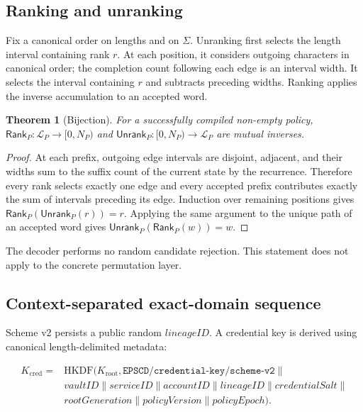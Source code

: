 \documentclass[preprint,12pt]{elsarticle}
\newcommand{\Lang}{\mathcal{L}}
\newcommand{\Rank}{\mathsf{Rank}}
\newcommand{\Unrank}{\mathsf{Unrank}}
\newtheorem{theorem}{Theorem}
\begin{document}
\subsection{Ranking and unranking}

Fix a canonical order on lengths and on $\Sigma$. Unranking first selects the
length interval containing rank $r$. At each position, it considers outgoing
characters in canonical order; the completion count following each edge is an
interval width. It selects the interval containing $r$ and subtracts preceding
widths. Ranking applies the inverse accumulation to an accepted word.

\begin{theorem}[Bijection]
For a successfully compiled non-empty policy, $\Rank_P:\Lang_P\rightarrow
[0,N_P)$ and $\Unrank_P:[0,N_P)\rightarrow\Lang_P$ are mutual inverses.
\end{theorem}

\begin{proof}
At each prefix, outgoing edge intervals are disjoint, adjacent, and their widths
sum to the suffix count of the current state by the recurrence. Therefore every
rank selects exactly one edge and every accepted prefix contributes exactly the
sum of intervals preceding its edge. Induction over remaining positions gives
$\Rank_P(\Unrank_P(r))=r$. Applying the same argument to the unique path of an
accepted word gives $\Unrank_P(\Rank_P(w))=w$.
\end{proof}

The decoder performs no random candidate rejection. This statement does not
apply to the concrete permutation layer.

\subsection{Context-separated exact-domain sequence}

Scheme v2 persists a public random $\mathit{lineageID}$. A credential key is
derived using canonical length-delimited metadata:

\begin{align*}
K_{\mathrm{cred}}={}&\mathrm{HKDF}(K_{\mathrm{root}},
  \texttt{EPSCD/credential-key/scheme-v2}\parallel\\
 &\mathit{vaultID}\parallel\mathit{serviceID}\parallel\mathit{accountID}
 \parallel\mathit{lineageID}\parallel\mathit{credentialSalt}\parallel\\
 &\mathit{rootGeneration}\parallel\mathit{policyVersion}
 \parallel\mathit{policyEpoch}).
\end{align*}
\end{document}

